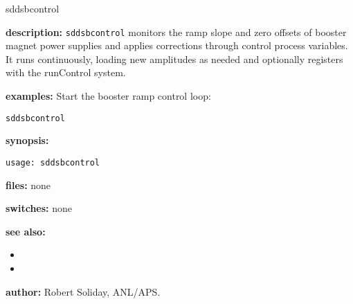%
\begin{sddsprog}{sddsbcontrol}
\item \textbf{description:}
\verb+sddsbcontrol+ monitors the ramp slope and zero offsets of booster magnet power supplies and applies corrections through control process variables. It runs continuously, loading new amplitudes as needed and optionally registers with the runControl system.

\item \textbf{examples:}
Start the booster ramp control loop:
\begin{verbatim}
sddsbcontrol
\end{verbatim}

\item \textbf{synopsis:}
\begin{verbatim}
usage: sddsbcontrol
\end{verbatim}

\item \textbf{files:} none

\item \textbf{switches:} none

\item \textbf{see also:}
\begin{itemize}
  \item {}
  \item {}
\end{itemize}

\item \textbf{author:} Robert Soliday, ANL/APS.
\end{sddsprog}
